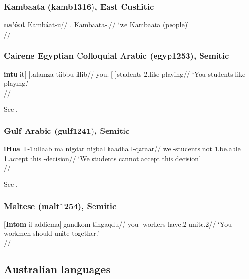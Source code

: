 \subsubsection{Kambaata (kamb1316), East Cushitic}

\ex 
\begingl
\gla \textbf{na'óot} Kambáat-u//
\Pl.\Nom{} Kambaata-\M.\Nom{}//
\glft `we Kambaata (people)' \\\citep[335, (1097)]{treis2008}//
\endgl
\xe

\subsubsection{Cairene Egyptian Colloquial Arabic (egyp1253), Semitic}

\ex
\begingl
\gla \textbf{\textglotstop{}intu} \textglotstop{}it[-]talamza ti\textcrh{}ibbu \textglotstop{}illi\textrevglotstop{}b//
\glb you.\Pl{} [\Def-]students 2\Pl{}.like playing//
\glft `You students like playing.'\\\citep[80, (533)]{garygamal1982}//
\endgl
\xe

See \citealp[78; 80]{garygamal1982}.

\subsubsection{Gulf Arabic (gulf1241), Semitic}


\ex
\begingl
\gla \textbf{iHna} T-Tullaab ma nigdar nigbal haadha l-qaraar//
\glb we \Def-students not 1\Pl.be.able 1\Pl.accept this \Def-decision//
\glft `We students cannot accept this decision'\\\citep[165, (845)]{holes1990}//
\endgl
\xe


See \citealp[162, 165]{holes1990}.

\subsubsection{Maltese (malt1254), Semitic}

\ex
\begingl
\gla {}[\textbf{Intom} il-\textcrh{}addiema] g\textcrh{}andkom ting\textcrh{}aqdu//
\glb you \Def-workers have.2\Pl{} unite.2\Pl{}//
\glft `You workmen should unite together.' \\{\citep[202, (915)]{borgazzopardialexander1997}}//
\endgl
\xe 


\subsection{Australian languages}

